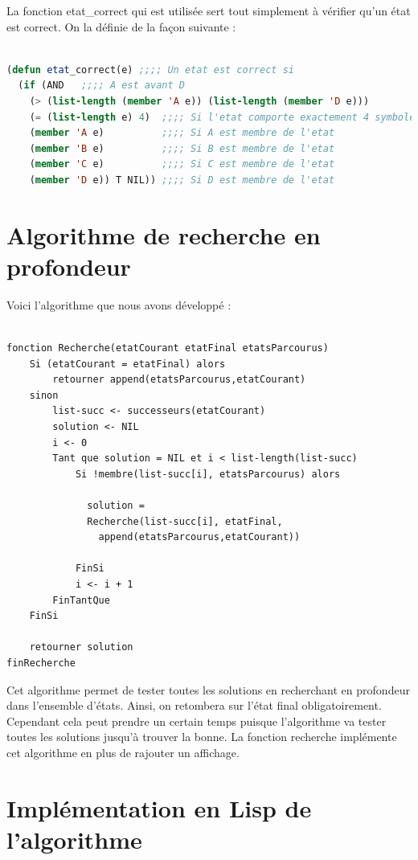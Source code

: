 \documentclass[a4paper,10pt]{report}
\begin{document}
  La fonction etat\_correct qui est utilisée sert tout simplement à vérifier qu'un état est correct. On la définie de la façon suivante : 
  \begin{lstlisting}[language=Lisp]
   
(defun etat_correct(e) ;;;; Un etat est correct si 
  (if (AND   ;;;; A est avant D 
	(> (list-length (member 'A e)) (list-length (member 'D e))) 
	(= (list-length e) 4)  ;;;; Si l'etat comporte exactement 4 symboles
	(member 'A e)          ;;;; Si A est membre de l'etat
	(member 'B e)          ;;;; Si B est membre de l'etat
	(member 'C e)          ;;;; Si C est membre de l'etat
	(member 'D e)) T NIL)) ;;;; Si D est membre de l'etat

  \end{lstlisting}

  
  
  
  \newpage
  \section{Algorithme de recherche en profondeur}

   Voici l’algorithme que nous avons développé :
   
   \begin{lstlisting}[basicstyle=\small]
   
fonction Recherche(etatCourant etatFinal etatsParcourus)
	Si (etatCourant = etatFinal) alors
		retourner append(etatsParcourus,etatCourant)
	sinon
		list-succ <- successeurs(etatCourant)
		solution <- NIL
		i <- 0
		Tant que solution = NIL et i < list-length(list-succ)
			Si !membre(list-succ[i], etatsParcourus) alors

			  solution = 
			  Recherche(list-succ[i], etatFinal, 
			    append(etatsParcourus,etatCourant))

			FinSi
			i <- i + 1
		FinTantQue
	FinSi
	
	retourner solution
finRecherche
  \end{lstlisting}

  Cet algorithme permet de tester toutes les solutions en recherchant en profondeur dans l’ensemble d’états. Ainsi, on retombera sur l’état final obligatoirement. Cependant cela peut prendre un certain temps puisque l’algorithme va tester toutes les solutions jusqu’à trouver la bonne. La fonction recherche implémente cet algorithme en plus de rajouter un affichage.
  
  \newpage 
  \section{Implémentation en Lisp de l'algorithme}
  
\end{document}
